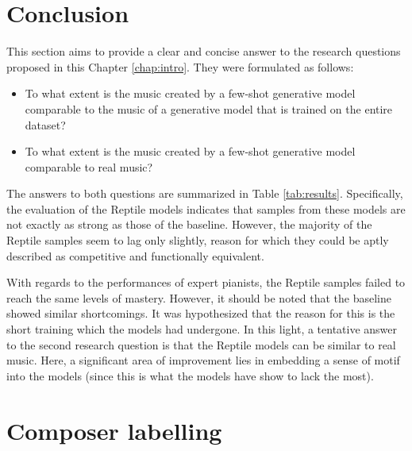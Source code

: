 \documentclass[a4paper]{book}
\begin{document}
\chapter{Conclusion}\label{chap:conclusion}

This section aims to provide a clear and concise answer to the research questions proposed in this Chapter \ref{chap:intro}. They were formulated as follows:

\begin{itemize}
    \item To what extent is the music created by a few-shot generative model comparable to the music of a generative model that is trained on the entire dataset?
    \item To what extent is the music created by a few-shot generative model comparable to real music?
\end{itemize}

The answers to both questions are summarized in Table \ref{tab:results}. Specifically, the evaluation of the Reptile models indicates that samples from these models are not exactly as strong as those of the baseline. However, the majority of the Reptile samples seem to lag only slightly, reason for which they could be aptly described as competitive and functionally equivalent.

With regards to the performances of expert pianists, the Reptile samples failed to reach the same levels of mastery. However, it should be noted that the baseline showed similar shortcomings. It was hypothesized that the reason for this is the short training which the models had undergone. In this light, a tentative answer to the second research question is that the Reptile models can be similar to real music. Here, a significant area of improvement lies in embedding a sense of motif into the models (since this is what the models have show to lack the most).

\sloppy
\printbibliography

\appendix

\chapter{Composer labelling} \label{appendix:labelling}
\end{document}
